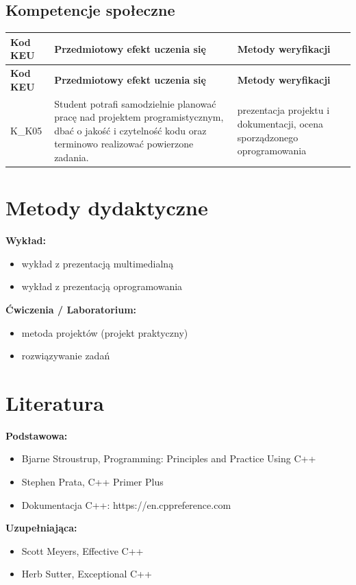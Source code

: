 \documentclass[12pt, a4paper]{article}
\newcommand{\thdrule}{\noalign{\global\setlength{\extrarowheight}{0pt}}}
\newcommand{\thdend}{\noalign{\global\setlength{\extrarowheight}{3pt}}}
\begin{document}
\subsection*{Kompetencje społeczne}
{\scriptsize
\begin{longtable}{m{1.6cm}m{9.0cm}m{4.2cm}}
\thdrule\toprule
\rowcolor{pjatkRed} {\color{white}\footnotesize\textbf{\vphantom{Ag}Kod KEU}} & {\color{white}\footnotesize\textbf{\vphantom{Ag}Przedmiotowy efekt uczenia się}} & {\color{white}\footnotesize\textbf{\vphantom{Ag}Metody weryfikacji}} \\
\midrule\thdend
\endfirsthead
\thdrule\toprule
\rowcolor{pjatkRed} {\color{white}\footnotesize\textbf{\vphantom{Ag}Kod KEU}} & {\color{white}\footnotesize\textbf{\vphantom{Ag}Przedmiotowy efekt uczenia się}} & {\color{white}\footnotesize\textbf{\vphantom{Ag}Metody weryfikacji}} \\
\midrule\thdend
\endhead
  \rowcolor{tableRowLight} K\_K05 & Student potrafi samodzielnie planować pracę nad projektem programistycznym, dbać o jakość i czytelność kodu oraz terminowo realizować powierzone zadania. & prezentacja projektu i dokumentacji, ocena sporządzonego oprogramowania \\
\bottomrule
\end{longtable}}

\section{Metody dydaktyczne}

\textbf{Wykład:}
\begin{itemize}
  \item wykład z prezentacją multimedialną
  \item wykład z prezentacją oprogramowania
\end{itemize}
\vspace{4pt}
\textbf{Ćwiczenia / Laboratorium:}
\begin{itemize}
  \item metoda projektów (projekt praktyczny)
  \item rozwiązywanie zadań
\end{itemize}
\vspace{4pt}


\section{Literatura}

\textbf{Podstawowa:}
\begin{itemize}
  \item Bjarne Stroustrup, Programming: Principles and Practice Using C++
  \item Stephen Prata, C++ Primer Plus
  \item Dokumentacja C++: https://en.cppreference.com
\end{itemize}

\textbf{Uzupełniająca:}
\begin{itemize}
  \item Scott Meyers, Effective C++
  \item Herb Sutter, Exceptional C++
\end{itemize}
\end{document}
